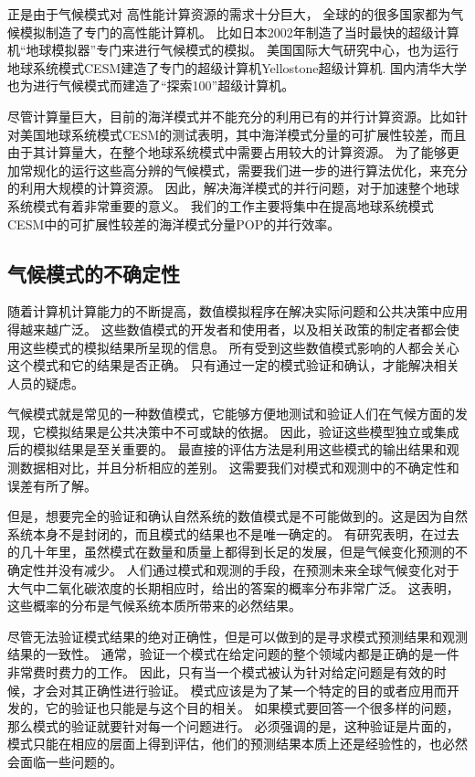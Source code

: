 正是由于气候模式对 高性能计算资源的需求十分巨大， 全球的的很多国家都为气候模拟制造了专门的高性能计算机。 比如日本2002年制造了当时最快的超级计算机“地球模拟器”专门来进行气候模式的模拟\cite{habata2003earth}。
美国国际大气研究中心，也为运行地球系统模式CESM建造了专门的超级计算机Yellostone超级计算机\cite{loft:2015}. 
国内清华大学也为进行气候模式而建造了“探索100”超级计算机。



尽管计算量巨大，目前的海洋模式并不能充分的利用已有的并行计算资源。比如针对美国地球系统模式CESM的测试表明，其中海洋模式分量的可扩展性较差，而且由于其计算量大，在整个地球系统模式中需要占用较大的计算资源。
为了能够更加常规化的运行这些高分辨的气候模式，需要我们进一步的进行算法优化，来充分的利用大规模的计算资源。
因此，解决海洋模式的并行问题，对于加速整个地球系统模式有着非常重要的意义。
我们的工作主要将集中在提高地球系统模式CESM中的可扩展性较差的海洋模式分量POP的并行效率。  
 

\subsection{气候模式的不确定性}
随着计算机计算能力的不断提高，数值模拟程序在解决实际问题和公共决策中应用得越来越广泛。 
这些数值模式的开发者和使用者，以及相关政策的制定者都会使用这些模式的模拟结果所呈现的信息。
所有受到这些数值模式影响的人都会关心这个模式和它的结果是否正确。
只有通过一定的模式验证和确认，才能解决相关人员的疑虑\cite{whitner1989guidelines,stainforth2005uncertainty}。

气候模式就是常见的一种数值模式，它能够方便地测试和验证人们在气候方面的发现，它模拟结果是公共决策中不可或缺的依据\cite{allen2002towards,reynolds1994random}。
因此，验证这些模型独立或集成后的模拟结果是至关重要的。
最直接的评估方法是利用这些模式的输出结果和观测数据相对比，并且分析相应的差别。 
这需要我们对模式和观测中的不确定性和误差有所了解。 

但是，想要完全的验证和确认自然系统的数值模式是不可能做到的。这是因为自然系统本身不是封闭的，而且模式的结果也不是唯一确定的\cite{oreskes1994verification}。
有研究表明，在过去的几十年里，虽然模式在数量和质量上都得到长足的发展，但是气候变化预测的不确定性并没有减少。 
人们通过模式和观测的手段，在预测未来全球气候变化对于大气中二氧化碳浓度的长期相应时，给出的答案的概率分布非常广泛。
这表明，这些概率的分布是气候系统本质所带来的必然结果\cite{roe2007climate}。 

尽管无法验证模式结果的绝对正确性，但是可以做到的是寻求模式预测结果和观测结果的一致性。
通常，验证一个模式在给定问题的整个领域内都是正确的是一件非常费时费力的工作。 
因此，只有当一个模式被认为针对给定问题是有效的时候，才会对其正确性进行验证。 
模式应该是为了某一个特定的目的或者应用而开发的，它的验证也只能是与这个目的相关\cite{sargent2005verification}。
如果模式要回答一个很多样的问题，那么模式的验证就要针对每一个问题进行。
必须强调的是，这种验证是片面的，模式只能在相应的层面上得到评估，他们的预测结果本质上还是经验性的，也必然会面临一些问题的。


